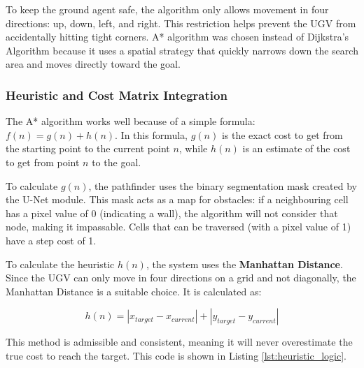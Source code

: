 \documentclass[12pt, a4paper]{article}
\begin{document}
\vspace{0.5cm}

To keep the ground agent safe, the algorithm only allows movement in four directions: up, down, left, and right. This restriction helps prevent the UGV from accidentally hitting tight corners. A* algorithm was chosen instead of Dijkstra’s Algorithm because it uses a spatial strategy that quickly narrows down the search area and moves directly toward the goal.

\vspace{0.5cm}

\subsubsection{Heuristic and Cost Matrix Integration}

\quad The A* algorithm works well because of a simple formula: $f(n) = g(n) + h(n)$. In this formula, $g(n)$ is the exact cost to get from the starting point to the current point $n$, while $h(n)$ is an estimate of the cost to get from point $n$ to the goal.

\vspace{0.5cm}

To calculate $g(n)$, the pathfinder uses the binary segmentation mask created by the U-Net module. This mask acts as a map for obstacles: if a neighbouring cell has a pixel value of 0 (indicating a wall), the algorithm will not consider that node, making it impassable. Cells that can be traversed (with a pixel value of 1) have a step cost of 1.

\vspace{0.5cm}

To calculate the heuristic $h(n)$, the system uses the \textbf{Manhattan Distance}. Since the UGV can only move in four directions on a grid and not diagonally, the Manhattan Distance is a suitable choice. It is calculated as:

$$h(n) = |x_{target} - x_{current}| + |y_{target} - y_{current}|$$

\vspace{0.25cm}

\hspace{-1.5em}This method is admissible and consistent, meaning it will never overestimate the true cost to reach the target. This code is shown in Listing \ref{lst:heuristic_logic}.

\vspace{0.5cm}
\end{document}
